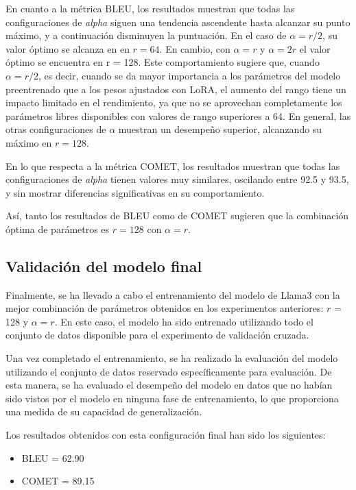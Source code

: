 \documentclass[11pt,spanish,listoffigures,listoftables]{tfgetsinf}
\begin{document}
En cuanto a la métrica BLEU, los resultados muestran que todas las configuraciones de \textit{alpha} siguen una tendencia ascendente hasta alcanzar su punto máximo, y a continuación disminuyen la puntuación. En el caso de $\alpha = r/2$, su valor óptimo se alcanza en en $r = 64$. En cambio, con $\alpha = r$ y $\alpha = 2r$ el valor óptimo se encuentra en r = 128. Este comportamiento sugiere que, cuando $\alpha = r/2$, es decir, cuando se da mayor importancia a los parámetros del modelo preentrenado que a los pesos ajustados con LoRA, el aumento del rango tiene un impacto limitado en el rendimiento, ya que no se aprovechan completamente los parámetros libres disponibles con valores de rango superiores a 64. En general, las otras configuraciones de $\alpha$ muestran un desempeño superior, alcanzando su máximo en $r = 128$.

En lo que respecta a la métrica COMET, los resultados muestran que todas las configuraciones de \textit{alpha} tienen valores muy similares, oscilando entre 92.5 y 93.5, y sin mostrar diferencias significativas en su comportamiento.

Así, tanto los resultados de BLEU como de COMET sugieren que la combinación óptima de parámetros es $r = 128$ con $\alpha = r$.

\subsection{Validación del modelo final}

Finalmente, se ha llevado a cabo el entrenamiento del modelo de Llama3 con la mejor combinación de parámetros obtenidos en los experimentos anteriores: $r$ = 128 y $\alpha = r$. En este caso, el modelo ha sido entrenado utilizando todo el conjunto de datos disponible para el experimento de validación cruzada.

Una vez completado el entrenamiento, se ha realizado la evaluación del modelo utilizando el conjunto de datos reservado específicamente para evaluación. De esta manera, se ha evaluado el desempeño del modelo en datos que no habían sido vistos por el modelo en ninguna fase de entrenamiento, lo que proporciona una medida de su capacidad de generalización.

Los resultados obtenidos con esta configuración final han sido los siguientes:

\begin{itemize}
	\item BLEU = 62.90
	\item COMET = 89.15
\end{itemize}
\end{document}
